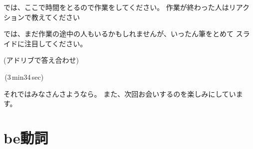 \documentclass[book,jafontscale=0.9247]{jlreq}
\newenvironment{my_check}
  {\begin{itemize}
    \renewcommand\labelitemi{$\square\hspace{0.5em}$}} %
  {\end{itemize}}
\newcommand{\mySagyo}{%
\par%
\bigskip
では、ここで時間をとるので作業をしてください。
作業が終わった人はリアクションで教えてください\par%
\begin{minipage}[t]{.98\textwidth}
\mbox{}\hrulefill\mbox{}\par%
\mbox{}\hfill{}\raisebox{-.5\height}{作業}\hfill\mbox{}\par%
\mbox{}\hrulefill\mbox{}
\end{minipage}%
\par%
\bigskip%
では、まだ作業の途中の人もいるかもしれませんが、いったん筆をとめて
スライドに注目してください。%
\par%
\bigskip
}
\newcommand{\myStartLesson}{%
\vspace*{5pt}%
\noindent{}{\Large\gtfamily 授業スタート！}
\begin{my_check}
\item マイクON
\item カメラON\hspace{40pt}{\LARGE \ComputerMouse}
\end{my_check}
みなさん、こんにちは。
エデュオプちばの英語の授業にようこそ。\par
さて
音声は届いていますか？
なにかトラブルがあったら、チャットで教えてください。
どうぞよろしくお願いします。\par
きょうも暑いですね。
体調管理にはじゅうぶん気をつけてください。
みなさんも熱中症にならないように、
適切な水分補給をお願いします。
授業中でも差し支えありません。
遠慮なく水分を補給しながら、
リラックスして参加してください。\par
それでは授業にはいります。
\begin{my_check}
\item カメラOFF\hspace{40pt}{\LARGE \ComputerMouse}
\end{my_check}
}
\begin{document}
\mySagyo

(アドリブで答え合わせ)

\faVolumeUp\,(3\,min34\,sec)

{\large \ComputerMouse}


それではみなさんさようなら。
また、次回お会いするのを楽しみにしています。

\newpage


\chapter{be動詞}

%
%
%



%

%
%
%
%

%
%
\end{document}
